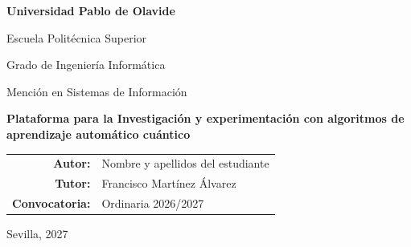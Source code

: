 \begin{titlepage}
  \thispagestyle{empty}
  \centering
  \vspace*{1.2cm}
  {\Large\textbf{Universidad Pablo de Olavide}\par}
  \vspace{0.4cm}
  {\large Escuela Politécnica Superior\par}
  \vspace{0.4cm}
  {\large Grado de Ingeniería Informática\par}
  {\large Mención en Sistemas de Información\par}

  \vfill
  {\LARGE\textbf{Plataforma para la Investigación y experimentación con algoritmos de aprendizaje automático cuántico}\par}

  \vfill
  \begin{tabular}{rl}
    \textbf{Autor:} & Nombre y apellidos del estudiante \\
    \textbf{Tutor:} & Francisco Martínez Álvarez \\
    \textbf{Convocatoria:} & Ordinaria 2026/2027
  \end{tabular}

  \vfill
  {\large Sevilla, 2027\par}
\end{titlepage}
